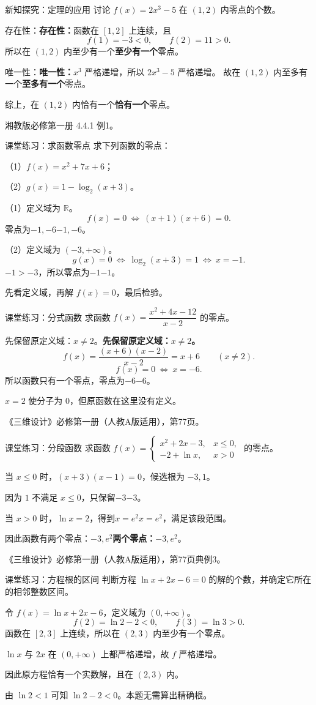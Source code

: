 \documentclass[aspectratio=169,10pt,handout]{beamer}
\newcommand{\key}[1]{{\ifmmode#1\else\bfseries #1\fi}}
\newcommand{\src}[1]{\par\vfill{\color{gray}\scriptsize #1}\par}
\newcommand{\gap}{\par\vspace{2mm}}
\begin{document}
\begin{frame}[t]{新知探究：定理的应用}
  \large
  讨论 $f(x)=2x^3-5$ 在 $(1,2)$ 内零点的个数。
  \pause
  \gap
  \key{存在性：}函数在 $[1,2]$ 上连续，且
  \[f(1)=-3<0,\qquad f(2)=11>0.\]
  所以在 $(1,2)$ 内\key{至少有一个}零点。
  \pause
  \gap
  \key{唯一性：}$x^3$ 严格递增，所以 $2x^3-5$ 严格递增。
  故在 $(1,2)$ 内\key{至多有一个}零点。
  \gap
  综上，在 $(1,2)$ 内\key{恰有一个}零点。
  \src{湘教版必修第一册 4.4.1 例1。}
\end{frame}

\begin{frame}[t]{课堂练习：求函数零点}
  \large
  求下列函数的零点：
  \par（1）$f(x)=x^2+7x+6$；
  \par（2）$g(x)=1-\log_2(x+3)$。
  \pause
  \gap
  （1）定义域为 $\mathbb R$。
  \[f(x)=0\ \Longleftrightarrow\ (x+1)(x+6)=0.\]
  零点为\key{$-1,-6$}。
  \pause
  \gap
  （2）定义域为 $(-3,+\infty)$。
  \[g(x)=0\ \Longleftrightarrow\ \log_2(x+3)=1
    \ \Longleftrightarrow\ x=-1.\]
  $-1>-3$，所以零点为\key{$-1$}。
  \src{先看定义域，再解 $f(x)=0$，最后检验。}
\end{frame}

\begin{frame}[t]{课堂练习：分式函数}
  \large
  求函数 $f(x)=\dfrac{x^2+4x-12}{x-2}$ 的零点。
  \gap
  \pause
  \key{先保留原定义域：$x\ne2$。}
  \[f(x)=\frac{(x+6)(x-2)}{x-2}=x+6\qquad(x\ne2).\]
  \pause
  \[f(x)=0\ \Longleftrightarrow\ x=-6.\]
  所以函数只有一个零点，零点为\key{$-6$}。
  \gap
  \alert{$x=2$ 使分子为 $0$，但原函数在这里没有定义。}
  \src{《三维设计》必修第一册（人教A版适用），第77页。}
\end{frame}

\begin{frame}[t]{课堂练习：分段函数}
  \large
  求函数 $f(x)=\begin{cases}x^2+2x-3,&x\le0,\\-2+\ln x,&x>0\end{cases}$ 的零点。
  \pause
  \gap
  当 $x\le0$ 时，$(x+3)(x-1)=0$，候选根为 $-3,1$。
  \gap 因为 $1$ 不满足 $x\le0$，只保留\key{$-3$}。
  \pause
  \gap
  当 $x>0$ 时，$\ln x=2$，得到\key{$x=e^2$}，满足该段范围。
  \gap
  因此函数有\key{两个零点：$-3,e^2$}。
  \src{《三维设计》必修第一册（人教A版适用），第77页典例3。}
\end{frame}

\begin{frame}[t]{课堂练习：方程根的区间}
  \large
  判断方程 $\ln x+2x-6=0$ 的解的个数，并确定它所在的相邻整数区间。
  \pause
  \gap
  令 $f(x)=\ln x+2x-6$，定义域为 $(0,+\infty)$。
  \[f(2)=\ln2-2<0,\qquad f(3)=\ln3>0.\]
  函数在 $[2,3]$ 上连续，所以在 $(2,3)$ 内至少有一个零点。
  \pause
  \gap
  $\ln x$ 与 $2x$ 在 $(0,+\infty)$ 上都严格递增，故 $f$ 严格递增。
  \gap
  因此原方程恰有一个实数解，且在 $(2,3)$ 内。
  \src{由 $\ln2<1$ 可知 $\ln2-2<0$。本题无需算出精确根。}
\end{frame}
\end{document}
